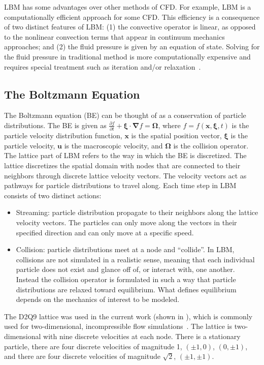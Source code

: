 \documentclass{article}
\newcommand{\pos}{\mathbf{x}}
\newcommand{\pvel}{\boldsymbol{\xi}}
\newcommand{\mvel}{\mathbf{u}}
\newcommand{\colop}{\boldsymbol{\Omega}}
\newcommand{\grad}{\boldsymbol{\nabla}}
\begin{document}
LBM has some advantages over other methods of CFD.
For example, LBM is a computationally efficient approach for some CFD.
This efficiency is a consequence of two distinct features of LBM: (1) the convective operator is linear, as opposed to the nonlinear convection terms that appear in continuum mechanics approaches; and (2) the fluid pressure is given by an equation of state.
Solving for the fluid pressure in traditional method is more computationally expensive and requires special treatment such as iteration and/or relaxation~\cite{chen1998lattice}.

\subsection{The Boltzmann Equation}
The Boltzmann equation (BE) can be thought of as a conservation of particle distributions.
The BE is given as $\frac{\partial f}{\partial t} + \pvel \cdot \grad f = \colop$, where $f = f(\pos, \pvel, t)$ is the particle velocity distribution function, $\pos$ is the spatial position vector, $\pvel$ is the particle velocity, $\mvel$ is the macroscopic velocity, and $\colop$ is the collision operator.
The lattice part of LBM refers to the way in which the BE is discretized.
The lattice discretizes the spatial domain with nodes that are connected to their neighbors through discrete lattice velocity vectors.
The velocity vectors act as pathways for particle distributions to travel along.
Each time step in LBM consists of two distinct actions:

\begin{itemize}
\item Streaming: particle distribution propagate to their neighbors along the lattice velocity vectors.
The particles can only move along the vectors in their specified direction and can only move at a specific speed.
\item Collision: particle distributions meet at a node and ``collide''.
In LBM, collisions are not simulated in a realistic sense, meaning that each individual particle does not exist and glance off of, or interact with, one another.
Instead the collision operator is formulated in such a way that particle distributions are relaxed toward equilibrium.
What defines equilibrium depends on the mechanics of interest to be modeled.
\end{itemize}

The D2Q9 lattice was used in the current work (shown in ), which is commonly used for two-dimensional, incompressible flow simulations~\cite{Suc01}. %
The lattice is two-dimensional with nine discrete velocities at each node.
There is a stationary particle, there are four discrete velocities of magnitude 1, $(\pm1,0)$, $(0,\pm1)$, and there are four discrete velocities of magnitude $\sqrt{2}$, $(\pm1, \pm1)$.
\end{document}
